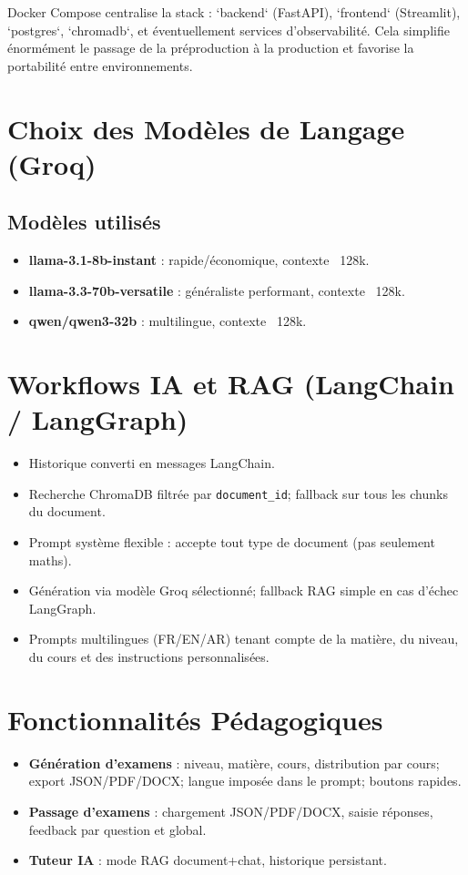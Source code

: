 Docker Compose centralise la stack : `backend` (FastAPI), `frontend` (Streamlit), `postgres`, `chromadb`, et éventuellement services d’observabilité. Cela simplifie énormément le passage de la préproduction à la production et favorise la portabilité entre environnements.

\section{Choix des Modèles de Langage (Groq)}

\subsection{Modèles utilisés}
\begin{itemize}
    \item \textbf{llama-3.1-8b-instant} : rapide/économique, contexte ~128k.
    \item \textbf{llama-3.3-70b-versatile} : généraliste performant, contexte ~128k.
    \item \textbf{qwen/qwen3-32b} : multilingue, contexte ~128k.
\end{itemize}

\section{Workflows IA et RAG (LangChain / LangGraph)}
\begin{itemize}
    \item Historique converti en messages LangChain.
    \item Recherche ChromaDB filtrée par \texttt{document\_id}; fallback sur tous les chunks du document.
    \item Prompt système flexible : accepte tout type de document (pas seulement maths).
    \item Génération via modèle Groq sélectionné; fallback RAG simple en cas d’échec LangGraph.
    \item Prompts multilingues (FR/EN/AR) tenant compte de la matière, du niveau, du cours et des instructions personnalisées.
\end{itemize}

\section{Fonctionnalités Pédagogiques}
\begin{itemize}
    \item \textbf{Génération d’examens} : niveau, matière, cours, distribution par cours; export JSON/PDF/DOCX; langue imposée dans le prompt; boutons rapides.
    \item \textbf{Passage d’examens} : chargement JSON/PDF/DOCX, saisie réponses, feedback par question et global.
    \item \textbf{Tuteur IA} : mode RAG document+chat, historique persistant.
\end{itemize}

